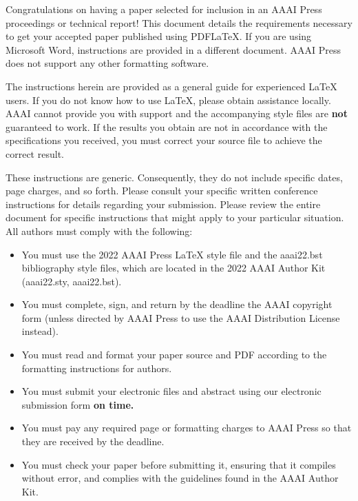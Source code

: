 \documentclass[letterpaper]{article} %
\begin{document}
\maketitle
Congratulations on having a paper selected for inclusion in an AAAI Press proceedings or technical report! This document details the requirements necessary to get your accepted paper published using PDF\LaTeX{}. If you are using Microsoft Word, instructions are provided in a different document. AAAI Press does not support any other formatting software.

The instructions herein are provided as a general guide for experienced \LaTeX{} users. If you do not know how to use \LaTeX{}, please obtain assistance locally. AAAI cannot provide you with support and the accompanying style files are \textbf{not} guaranteed to work. If the results you obtain are not in accordance with the specifications you received, you must correct your source file to achieve the correct result.

These instructions are generic. Consequently, they do not include specific dates, page charges, and so forth. Please consult your specific written conference instructions for details regarding your submission. Please review the entire document for specific instructions that might apply to your particular situation. All authors must comply with the following:

\begin{itemize}
\item You must use the 2022 AAAI Press \LaTeX{} style file and the aaai22.bst bibliography style files, which are located in the 2022 AAAI Author Kit (aaai22.sty, aaai22.bst).
\item You must complete, sign, and return by the deadline the AAAI copyright form (unless directed by AAAI Press to use the AAAI Distribution License instead).
\item You must read and format your paper source and PDF according to the formatting instructions for authors.
\item You must submit your electronic files and abstract using our electronic submission form \textbf{on time.}
\item You must pay any required page or formatting charges to AAAI Press so that they are received by the deadline.
\item You must check your paper before submitting it, ensuring that it compiles without error, and complies with the guidelines found in the AAAI Author Kit.
\end{itemize}
\end{document}
